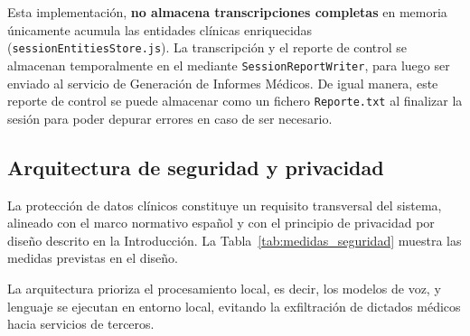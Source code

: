 

Esta implementación, \textbf{no almacena transcripciones completas} en memoria únicamente
acumula las entidades clínicas enriquecidas (\texttt{sessionEntitiesStore.js}). 
La transcripción y el reporte de control se almacenan temporalmente en el
 mediante \texttt{SessionReportWriter}, para luego ser enviado
al servicio de Generación de Informes Médicos.
De igual manera, este reporte de control se puede almacenar como un fichero \texttt{Reporte.txt}
al finalizar la sesión para poder depurar errores en caso de ser necesario.


\subsection{Arquitectura de seguridad y privacidad}\label{subsection:seguridad_privacidad}

La protección de datos clínicos constituye un requisito transversal del sistema, alineado con el
marco normativo español  y con el principio de privacidad por diseño descrito en la
Introducción. La Tabla~\ref{tab:medidas_seguridad} muestra las medidas previstas en el diseño.



La arquitectura prioriza el procesamiento local, es decir, los modelos de voz, 
y lenguaje se ejecutan en entorno local, evitando la exfiltración de dictados médicos hacia servicios de terceros.

